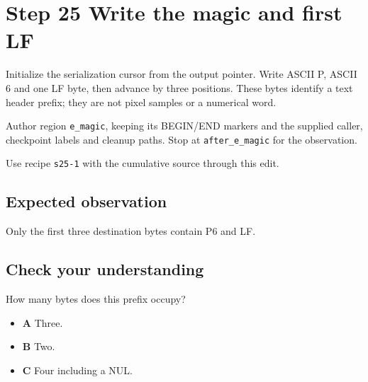 \section{Step 25 Write the magic and first LF}\label{ppm-s25}

Initialize the serialization cursor from the output pointer. Write ASCII P, ASCII 6 and one LF byte, then advance by three positions. These bytes identify a text header prefix; they are not pixel samples or a numerical word.

Author region \texttt{e\_magic}, keeping its BEGIN/END markers and the supplied caller, checkpoint labels and cleanup paths. Stop at \texttt{after\_e\_magic} for the observation.

Use recipe \texttt{s25-1} with the cumulative source through this edit.

\subsection{Expected observation}
Only the first three destination bytes contain P6 and LF.

\subsection{Check your understanding}
How many bytes does this prefix occupy?

\begin{itemize}
  \item \textbf{A} Three.
  \item \textbf{B} Two.
  \item \textbf{C} Four including a NUL.
\end{itemize}
